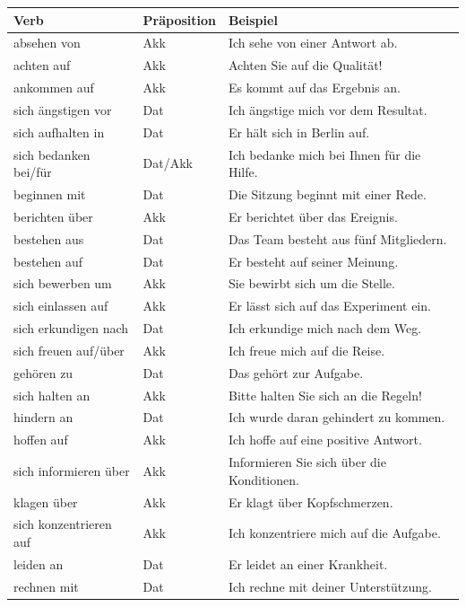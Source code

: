 \bigskip
\begin{center}
\begin{tabular}{|l|l|l|}
\hline
Verb & Präposition & Beispiel \\ \hline
absehen von & Akk & Ich sehe von einer Antwort ab. \\ \hline
achten auf & Akk & Achten Sie auf die Qualität! \\ \hline
ankommen auf & Akk & Es kommt auf das Ergebnis an. \\ \hline
sich ängstigen vor & Dat & Ich ängstige mich vor dem Resultat. \\ \hline
sich aufhalten in & Dat & Er hält sich in Berlin auf. \\ \hline
sich bedanken bei/für & Dat/Akk & Ich bedanke mich bei Ihnen für die Hilfe. \\ \hline
beginnen mit & Dat & Die Sitzung beginnt mit einer Rede. \\ \hline
berichten über & Akk & Er berichtet über das Ereignis. \\ \hline
bestehen aus & Dat & Das Team besteht aus fünf Mitgliedern. \\ \hline
bestehen auf & Dat & Er besteht auf seiner Meinung. \\ \hline
sich bewerben um & Akk & Sie bewirbt sich um die Stelle. \\ \hline
sich einlassen auf & Akk & Er lässt sich auf das Experiment ein. \\ \hline
sich erkundigen nach & Dat & Ich erkundige mich nach dem Weg. \\ \hline
sich freuen auf/über & Akk & Ich freue mich auf die Reise. \\ \hline
gehören zu & Dat & Das gehört zur Aufgabe. \\ \hline
sich halten an & Akk & Bitte halten Sie sich an die Regeln! \\ \hline
hindern an & Dat & Ich wurde daran gehindert zu kommen. \\ \hline
hoffen auf & Akk & Ich hoffe auf eine positive Antwort. \\ \hline
sich informieren über & Akk & Informieren Sie sich über die Konditionen. \\ \hline
klagen über & Akk & Er klagt über Kopfschmerzen. \\ \hline
sich konzentrieren auf & Akk & Ich konzentriere mich auf die Aufgabe. \\ \hline
leiden an & Dat & Er leidet an einer Krankheit. \\ \hline
rechnen mit & Dat & Ich rechne mit deiner Unterstützung. \\ \hline

\end{tabular}
\end{center}
